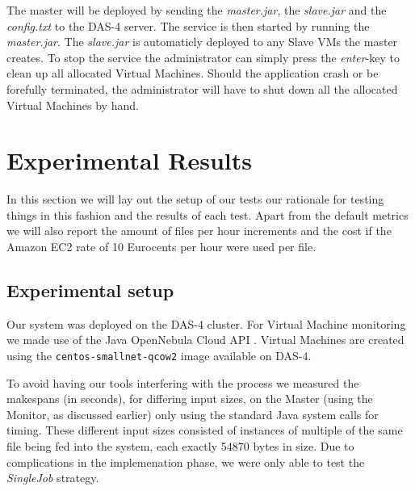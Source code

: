 \documentclass[twocolumn,twoside]{IEEEtran}
\begin{document}
The master will be deployed by sending the \emph{master.jar}, the \emph{slave.jar}
and the \emph{config.txt} to the DAS-4 server. The service is then started by
running the \emph{master.jar}. The \emph{slave.jar} is automaticly deployed to
any Slave VMs the master creates. To stop the service the administrator
can simply press the \emph{enter}-key to clean up all allocated Virtual Machines.
Should the application crash or be forefully terminated, the administrator will
have to shut down all the allocated Virtual Machines by hand.

\section{Experimental Results}
\label{sec:setup}
In this section we will lay out the setup of our tests
our rationale for testing things in this fashion and the
results of each test. Apart from the default metrics
we will also report the amount of files per hour increments and 
the cost if the Amazon EC2 rate of 10 Eurocents per
hour were used per file.

\subsection{Experimental setup}
Our system was deployed on the DAS-4 cluster\cite{das4}.
For Virtual Machine monitoring we made use of the 
Java OpenNebula Cloud API \cite{opennebulaapi}. Virtual Machines are created using the \texttt{centos-smallnet-qcow2} image available on DAS-4.

To avoid having our tools interfering with the process
we measured the makespans (in seconds), for differing
input sizes,
on the Master (using the Monitor, as discussed earlier) only using the standard Java system calls
for timing.
These different input sizes consisted of instances of
multiple of the same file being fed into the system, each exactly 54870 bytes in size. 
Due to complications in the implemenation phase, we were
only able to test the \emph{SingleJob} strategy.
\end{document}
